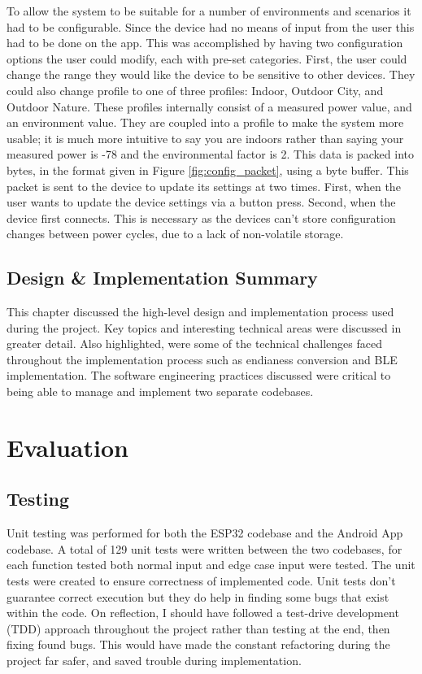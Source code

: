 \documentclass{l4proj}
\begin{document}
To allow the system to be suitable for a number of environments and scenarios it had to be configurable. Since the device had no means of input from the user this had to be done on the app. This was accomplished by having two configuration options the user could modify, each with pre-set categories. First, the user could change the range they would like the device to be sensitive to other devices. They could also change profile to one of three profiles: Indoor, Outdoor City, and Outdoor Nature. These profiles internally consist of a measured power value, and an environment value. They are coupled into a profile to make the system more usable; it is much more intuitive to say you are indoors rather than saying your measured power is -78 and the environmental factor is 2. This data is packed into bytes, in the format given in Figure \ref{fig:config_packet}, using a byte buffer. This packet is sent to the device to update its settings at two times. First, when the user wants to update the device settings via a button press. Second, when the device first connects. This is necessary as the devices can't store configuration changes between power cycles, due to a lack of non-volatile storage.

\section{Design \& Implementation Summary}

This chapter discussed the high-level design and implementation process used during the project. Key topics and interesting technical areas were discussed in greater detail. Also highlighted, were some of the technical challenges faced throughout the implementation process such as endianess conversion and BLE implementation. The software engineering practices discussed were critical to being able to manage and implement two separate codebases.

\chapter{Evaluation}

\section{Testing}

Unit testing was performed for both the ESP32 codebase and the Android App codebase. A total of 129 unit tests were written between the two codebases, for each function tested both normal input and edge case input were tested. The unit tests were created to ensure correctness of implemented code. Unit tests don't guarantee correct execution but they do help in finding some bugs that exist within the code. On reflection, I should have followed a test-drive development (TDD) approach throughout the project rather than testing at the end, then fixing found bugs. This would have made the constant refactoring during the project far safer, and saved trouble during implementation.
\end{document}
